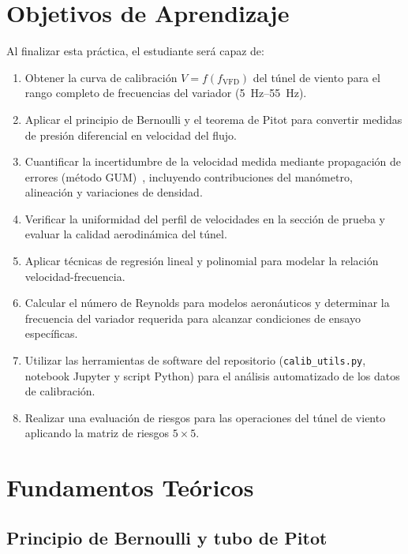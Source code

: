 \documentclass[12pt,a4paper]{article}
\begin{document}
\section{Objetivos de Aprendizaje}
\label{sec:objetivos}

Al finalizar esta práctica, el estudiante será capaz de:
\begin{enumerate}
	\item Obtener la curva de calibración $V = f(f_\mathrm{VFD})$ del túnel de
	      viento para el rango completo de frecuencias del variador
	      (\SIrange{5}{55}{\Hz}).
	\item Aplicar el principio de Bernoulli y el teorema de Pitot para convertir
	      medidas de presión diferencial en velocidad del flujo.
	\item Cuantificar la incertidumbre de la velocidad medida mediante
	      propagación de errores (método GUM)~\cite{gum2008}, incluyendo
	      contribuciones del manómetro, alineación y variaciones de densidad.
	\item Verificar la uniformidad del perfil de velocidades en la sección de
	      prueba y evaluar la calidad aerodinámica del túnel.
	\item Aplicar técnicas de regresión lineal y polinomial para modelar la
	      relación velocidad-frecuencia.
	\item Calcular el número de Reynolds para modelos aeronáuticos y determinar
	      la frecuencia del variador requerida para alcanzar condiciones de
	      ensayo específicas.
	\item Utilizar las herramientas de software del repositorio
	      (\texttt{calib\_utils.py}, notebook Jupyter y script Python) para el
	      análisis automatizado de los datos de calibración.
	\item Realizar una evaluación de riesgos para las operaciones del túnel de
	      viento aplicando la matriz de riesgos $5\times5$.
\end{enumerate}

\section{Fundamentos Teóricos}
\label{sec:teoria}

\subsection{Principio de Bernoulli y tubo de Pitot}
\end{document}
